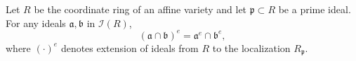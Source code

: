 Let $R$ be the coordinate ring of an affine variety and let $\mathfrak{p} \subset R$ be a prime ideal. For any ideals $\mathfrak{a}, \mathfrak{b}$ in $\mathcal{I}(R)$,
$$(\mathfrak{a} \cap \mathfrak{b})^e = \mathfrak{a}^e \cap \mathfrak{b}^e,$$
where $(\cdot)^e$ denotes extension of ideals from $R$ to the localization $R_{\mathfrak{p}}$.
